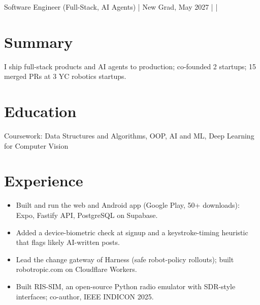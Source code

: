 \documentclass[10pt]{article}
\begin{document}
{Software Engineer (Full-Stack, AI Agents) | New Grad, May 2027}
{ |  | }

\section{Summary}
I ship full-stack products and AI agents to production; co-founded 2 startups; 15 merged PRs at 3 YC robotics startups.

\section{Education}
Coursework: Data Structures and Algorithms, OOP, AI and ML, Deep Learning for Computer Vision\par

\section{Experience}
\begin{itemize}
\item Built and run the web and Android app (Google Play, 50+ downloads): Expo, Fastify API, PostgreSQL on Supabase.
\item Added a device-biometric check at signup and a keystroke-timing heuristic that flags likely AI-written posts.
\end{itemize}
\begin{itemize}
\item Lead the change gateway of Harness (safe robot-policy rollouts); built robotropic.com on Cloudflare Workers.
\end{itemize}
\begin{itemize}
\item Built RIS-SIM, an open-source Python radio emulator with SDR-style interfaces; co-author, IEEE INDICON 2025.
\end{itemize}
\end{document}
